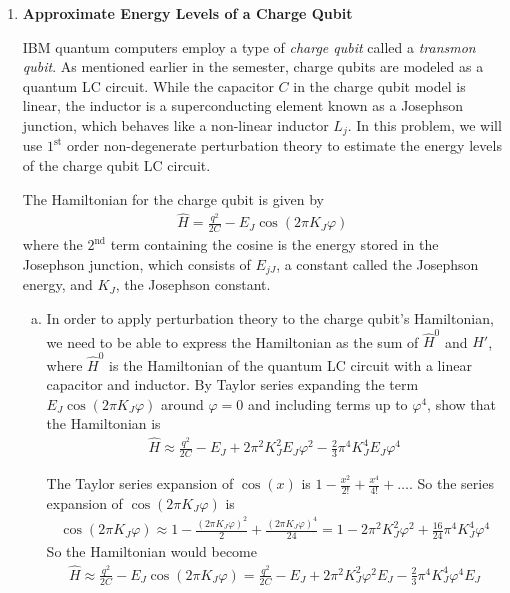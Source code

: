 \documentclass[10pt,letterpaper]{article}
\begin{document}
\begin{enumerate}
\begin{enumerate}[a)]
\end{enumerate}

\item \textbf{Approximate Energy Levels of a Charge Qubit}

IBM quantum computers employ a type of \textit{charge qubit} called a \textit{transmon qubit}. As mentioned earlier in the semester, charge qubits are modeled as a quantum LC circuit. While the capacitor $C$ in the charge qubit model is linear, the inductor is a
superconducting element known as a Josephson junction, which behaves like a non-linear inductor $L_{j}$. In this problem, we will use $1^{\text{st}}$ order non-degenerate perturbation theory to estimate the energy levels of the charge qubit LC circuit.

The Hamiltonian for the charge qubit is given by
\begin{gather*}
\hat{H} = \frac{q^{2}}{2C} - E_{J}\cos(2\pi K_{J} \varphi)
\end{gather*}
where the $2^{\text{nd}}$ term containing the cosine is the energy stored in the Josephson junction, which consists of $E_{jJ}$, a constant called the Josephson energy, and $K_{J}$, the Josephson constant. 

\begin{enumerate}[a)]

\item In order to apply perturbation theory to the charge qubit’s Hamiltonian, we need to be able to express the Hamiltonian as the sum of $\hat{H}^{0}$ and $\hat{H}'$, where $\hat{H}^{0}$ is the Hamiltonian of the quantum LC circuit with a linear capacitor and inductor. By Taylor series expanding the term $E_{J}\cos(2\pi K_{J}\varphi)$ around $\varphi = 0$ and including terms up to $\varphi^{4}$, show that the Hamiltonian is
\begin{gather*}
\hat{H} \approx \frac{q^{2}}{2C} - E_{J} + 2\pi^{2}K_{J}^{2}E_{J}\varphi^{2} - \frac{2}{3} \pi^{4}K_{J}^{4}E_{J}\varphi^{4}
\end{gather*}

\color{violet}
The Taylor series expansion of $\cos(x)$ is $1 - \frac{x^{2}}{2!} + \frac{x^{4}}{4!} + \dots$. So the series expansion of $\cos(2\pi K_{J}\varphi)$ is
\begin{gather*}
\cos(2\pi K_{J}\varphi) \approx 1 - \frac{(2\pi K_{J}\varphi)^{2}}{2} + \frac{(2\pi K_{J}\varphi)^{4}}{24} = 1 - 2\pi^{2}K_{J}^{2}\varphi^{2} + \frac{16}{24}\pi^{4}K_{J}^{4}\varphi^{4}
\end{gather*}
So the Hamiltonian would become
\begin{gather*}
\hat{H} \approx \frac{q^{2}}{2C} - E_{J}\cos(2\pi K_{J}\varphi) = \frac{q^{2}}{2C} - E_{J} + 2\pi^{2}K_{J}^{2}\varphi^{2}E_{J} - \frac{2}{3}\pi^{4}K_{J}^{4}\varphi^{4}E_{J}
\end{gather*}
\color{black}


\end{enumerate}
\end{enumerate}
\end{document}
